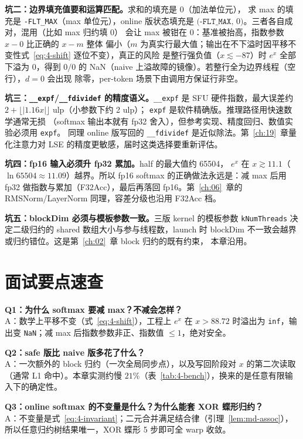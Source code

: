 \textbf{坑二：边界填充值要和运算匹配。}求和的填充是 $0$（加法单位元），
求 max 的填充是 \texttt{-FLT\_MAX}（max 单位元），online 版状态填充是
$\bigl(\texttt{-FLT\_MAX},\, 0\bigr)$。三者各自成对，混用（比如 max 归约填 0）
会让 max 被钳在 0：基准被抬高，指数参数 $x - 0$ 比正确的 $x - m$ 整体
偏小（$m$ 为真实行最大值；输出在不下溢时因平移不变性式~\ref{eq:4-shift}
逐位不变），真正的风险
是整行强负值（$x \lesssim -87$）时 $e^{x}$ 全部下溢为 0，得到 $0/0$ 的
NaN（naive 上溢故障的镜像）。若整行全为边界线程（空行），$d = 0$ 会出现
除零，per-token 场景下由调用方保证行非空。

\textbf{坑三：\texttt{\_\_expf}/\texttt{\_\_fdividef} 的精度语义。}\texttt{\_\_expf}
是 SFU 硬件指数，最大误差约 $2+\lfloor|1.16x|\rfloor$ ulp（小参数下约 2 ulp）；
\texttt{expf} 是软件精确版。推理路径用快速数学通常无损
（softmax 输出本就有 fp32 舍入），但参考实现、精度回归、数值实验必须用 \texttt{expf}。
同理 online 版写回的 \texttt{\_\_fdividef} 是近似除法。第~\ref{ch:19}~章量化注意力对
LSE 的精度更敏感，届时这类选择要重新评估。

\textbf{坑四：fp16 输入必须升 fp32 累加。}\allowbreak{}half 的最大值约 65504，
$e^{x}$ 在 $x \gtrsim 11.1$（$\ln 65504 \approx 11.09$）越界。所以 fp16 softmax 的正确做法永远是：减 max 后用 fp32
做指数与累加（F32Acc），最后再落回 fp16。第~\ref{ch:06}~章的 RMSNorm/LayerNorm
同理，容差分级也沿用 F32Acc 档。

\textbf{坑五：blockDim 必须与模板参数一致。}三版 kernel 的模板参数
\texttt{kNumThreads} 决定二级归约的 shared 数组大小与参与线程数，launch 时
blockDim 不一致会越界或归约错位。这是第~\ref{ch:02}~章 block 归约的既有约束，
本章沿用。

\section{面试要点速查}

\textbf{Q1：为什么 softmax 要减 max？不减会怎样？}\\
A：数学上平移不变（式~\ref{eq:4-shift}），工程上 $e^{x}$ 在 $x > 88.72$ 时溢出为
\texttt{inf}，输出变 \texttt{NaN}；减 max 后指数参数非正、指数值 $\le 1$，绝对安全。

\textbf{Q2：safe 版比 naive 版多花了什么？}\\
A：一次额外的 block 归约（一次全局同步点），以及写回阶段对 $x$ 的第二次读取
（通常 L1 命中）。本章实测约慢 $21\%$（表~\ref{tab:4-bench}），换来的是任意有限输入下的确定性。

\textbf{Q3：online softmax 的不变量是什么？为什么能套 XOR 蝶形归约？}\\
A：不变量是式~\ref{eq:4-invariant}；二元合并满足结合律（引理~\ref{lem:md-assoc}），
所以任意归约树结果唯一，XOR 蝶形 5 步即可全 warp 收敛。

